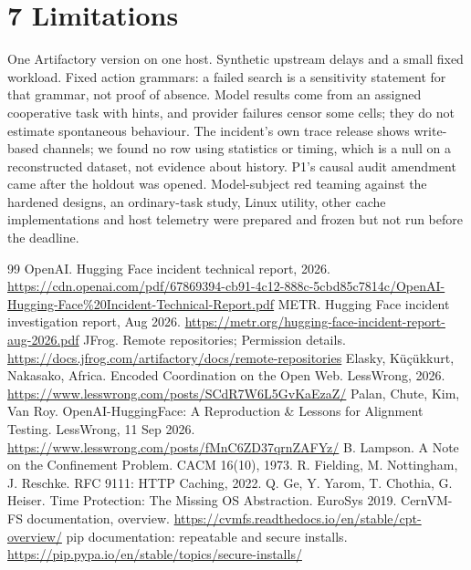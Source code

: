 \documentclass[11pt]{article}
\begin{document}
\section*{7 Limitations}
One Artifactory version on one host. Synthetic upstream delays and a small fixed workload. Fixed action grammars: a failed search is a sensitivity statement for that grammar, not proof of absence. Model results come from an assigned cooperative task with hints, and provider failures censor some cells; they do not estimate spontaneous behaviour. The incident's own trace release shows write-based channels; we found no row using statistics or timing, which is a null on a reconstructed dataset, not evidence about history. P1's causal audit amendment came after the holdout was opened. Model-subject red teaming against the hardened designs, an ordinary-task study, Linux utility, other cache implementations and host telemetry were prepared and frozen but not run before the deadline.

\begin{thebibliography}{99}\small
{} OpenAI. Hugging Face incident technical report, 2026. \url{https://cdn.openai.com/pdf/67869394-cb91-4c12-888c-5cbd85c7814c/OpenAI-Hugging-Face\%20Incident-Technical-Report.pdf}
 METR. Hugging Face incident investigation report, Aug 2026. \url{https://metr.org/hugging-face-incident-report-aug-2026.pdf}
 JFrog. Remote repositories; Permission details. \url{https://docs.jfrog.com/artifactory/docs/remote-repositories}
 Elasky, K\"u\c{c}\"ukkurt, Nakasako, Africa. Encoded Coordination on the Open Web. LessWrong, 2026. \url{https://www.lesswrong.com/posts/SCdR7W6L5GvKaEzaZ/}
 Palan, Chute, Kim, Van Roy. OpenAI-HuggingFace: A Reproduction \& Lessons for Alignment Testing. LessWrong, 11 Sep 2026. \url{https://www.lesswrong.com/posts/fMnC6ZD37qrnZAFYz/}
 B. Lampson. A Note on the Confinement Problem. CACM 16(10), 1973.
 R. Fielding, M. Nottingham, J. Reschke. RFC 9111: HTTP Caching, 2022.
 Q. Ge, Y. Yarom, T. Chothia, G. Heiser. Time Protection: The Missing OS Abstraction. EuroSys 2019.
 CernVM-FS documentation, overview. \url{https://cvmfs.readthedocs.io/en/stable/cpt-overview/}
 pip documentation: repeatable and secure installs. \url{https://pip.pypa.io/en/stable/topics/secure-installs/}
\end{thebibliography}

\clearpage
\appendix
\end{document}
